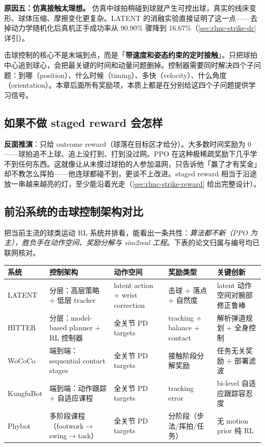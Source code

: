 \textbf{原因五：仿真接触太理想。} 仿真中球拍稍碰到球就产生可控出球，真实的线床变形、球体压缩、摩擦变化更复杂。LATENT 的消融实验直接证明了这一点——去掉动力学随机化后真机正手成功率从 90.90\% 骤降到 16.67\%（\cref{sec:rlmc-strike-dr} 详引）。

\begin{insight}\label{ins:rlmc-strike-timed-contact}
击球控制的核心不是末端到点，而是「\textbf{带速度和姿态约束的定时接触}」。只把球拍中心追到球心，会把最关键的时间和动量问题删掉。控制器需要同时解决四个子问题：到哪（position）、什么时候（timing）、多快（velocity）、什么角度（orientation）。本章后面所有奖励项，本质上都是在分别给这四个子问题提供学习信号。
\end{insight}

\subsection{如果不做 staged reward 会怎样}

\textbf{反面推演}：只给 outcome reward（球落在目标区才给分）。大多数时间奖励为 0——球拍追不上球、追上没打到、打到没过网。PPO 在这种极稀疏奖励下几乎学不到任何东西。这就像让从未摸过球拍的人参加温网，只告诉他「赢了才有奖金」却不教怎么挥拍——他连球都碰不到，更谈不上改进。staged reward 相当于沿途放一串越来越亮的灯，至少能沿着光走（\cref{sec:rlmc-strike-reward} 给出完整设计）。

\subsection{前沿系统的击球控制架构对比}

把当前主流的球类运动 RL 系统并排看，能看出一条共性：\emph{算法都不新（PPO 为主），胜负手在动作空间、奖励分解与 sim2real 工程}。下表的论文归属与编号均已联网核对。

\begin{center}
\small
\begin{tabularx}{\linewidth}{@{}lLLLL@{}}
\toprule
系统 & 控制架构 & 动作空间 & 奖励类型 & 关键创新 \\
\midrule
LATENT & 分层：高层策略 $+$ 低层 tracker & latent action $+$ wrist correction & 击球 $+$ 落点 $+$ 自然度 & latent 动作空间对腕部修正鲁棒 \\
HITTER & 分层：model-based planner $+$ RL 控制器 & 全关节 PD targets & tracking $+$ balance $+$ contact & 解析弹道规划 $+$ 全身控制 \\
WoCoCo & 端到端：sequential contact stages & 全关节 PD targets & 接触阶段分解奖励 & 任务无关奖励 $+$ 部署滤波 \\
KungfuBot & 端到端：动作跟踪 $+$ 自适应课程 & 全关节 PD targets & tracking error & bi-level 自适应跟踪容忍度 \\
Phybot & 多阶段课程（footwork$\to$swing$\to$task） & 全关节 PD targets & 分阶段（步法/挥拍/任务） & 无 motion prior 纯 RL \\
\bottomrule
\end{tabularx}
\end{center}

